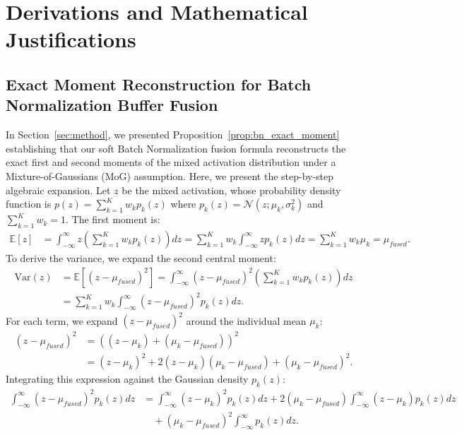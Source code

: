 \documentclass{article}
\theoremstyle{plain}
\theoremstyle{definition}
\theoremstyle{remark}
\begin{document}
\clearpage
\nocite{*}



\newpage
\appendix
\onecolumn
\section{Derivations and Mathematical Justifications}
\subsection{Exact Moment Reconstruction for Batch Normalization Buffer Fusion}
In Section~\ref{sec:method}, we presented Proposition~\ref{prop:bn_exact_moment} establishing that our soft Batch Normalization fusion formula reconstructs the exact first and second moments of the mixed activation distribution under a Mixture-of-Gaussians (MoG) assumption. Here, we present the step-by-step algebraic expansion.
Let $z$ be the mixed activation, whose probability density function is $p(z) = \sum_{k=1}^K w_k p_k(z)$ where $p_k(z) = \mathcal{N}(z; \mu_k, \sigma_k^2)$ and $\sum_{k=1}^K w_k = 1$.
The first moment is:
\begin{align}
\mathbb{E}[z] &= \int_{-\infty}^\infty z \left( \sum_{k=1}^K w_k p_k(z) \right) dz = \sum_{k=1}^K w_k \int_{-\infty}^\infty z p_k(z) dz = \sum_{k=1}^K w_k \mu_k = \mu_{fused}.
\end{align}
To derive the variance, we expand the second central moment:
\begin{align}
\text{Var}(z) &= \mathbb{E}[(z - \mu_{fused})^2] = \int_{-\infty}^\infty (z - \mu_{fused})^2 \left( \sum_{k=1}^K w_k p_k(z) \right) dz \\
&= \sum_{k=1}^K w_k \int_{-\infty}^\infty (z - \mu_{fused})^2 p_k(z) dz.
\end{align}
For each term, we expand $(z - \mu_{fused})^2$ around the individual mean $\mu_k$:
\begin{align}
(z - \mu_{fused})^2 &= \left( (z - \mu_k) + (\mu_k - \mu_{fused}) \right)^2 \\
&= (z - \mu_k)^2 + 2(z - \mu_k)(\mu_k - \mu_{fused}) + (\mu_k - \mu_{fused})^2.
\end{align}
Integrating this expression against the Gaussian density $p_k(z)$:
\begin{align}
\int_{-\infty}^\infty (z - \mu_{fused})^2 p_k(z) dz &= \int_{-\infty}^\infty (z - \mu_k)^2 p_k(z) dz + 2(\mu_k - \mu_{fused}) \int_{-\infty}^\infty (z - \mu_k) p_k(z) dz \\
&\quad + (\mu_k - \mu_{fused})^2 \int_{-\infty}^\infty p_k(z) dz.
\end{align}
\end{document}
